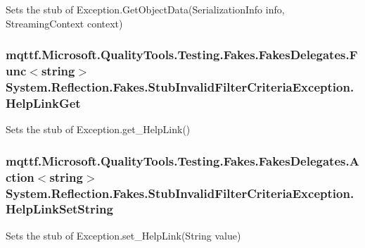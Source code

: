 Sets the stub of Exception.\-Get\-Object\-Data(\-Serialization\-Info info, Streaming\-Context context)

\hypertarget{class_system_1_1_reflection_1_1_fakes_1_1_stub_invalid_filter_criteria_exception_acaaad7e3ec7c490e4639ea72b419d6a7}{
\subsubsection[{Help\-Link\-Get}]{\setlength{\rightskip}{0pt plus 5cm}mqttf.\-Microsoft.\-Quality\-Tools.\-Testing.\-Fakes.\-Fakes\-Delegates.\-Func$<$string$>$ System.\-Reflection.\-Fakes.\-Stub\-Invalid\-Filter\-Criteria\-Exception.\-Help\-Link\-Get}}\label{class_system_1_1_reflection_1_1_fakes_1_1_stub_invalid_filter_criteria_exception_acaaad7e3ec7c490e4639ea72b419d6a7}


Sets the stub of Exception.\-get\-\_\-\-Help\-Link()

\hypertarget{class_system_1_1_reflection_1_1_fakes_1_1_stub_invalid_filter_criteria_exception_a18efd7ed48f4fd4dcf24823d49ee20ef}{
\subsubsection[{Help\-Link\-Set\-String}]{\setlength{\rightskip}{0pt plus 5cm}mqttf.\-Microsoft.\-Quality\-Tools.\-Testing.\-Fakes.\-Fakes\-Delegates.\-Action$<$string$>$ System.\-Reflection.\-Fakes.\-Stub\-Invalid\-Filter\-Criteria\-Exception.\-Help\-Link\-Set\-String}}\label{class_system_1_1_reflection_1_1_fakes_1_1_stub_invalid_filter_criteria_exception_a18efd7ed48f4fd4dcf24823d49ee20ef}


Sets the stub of Exception.\-set\-\_\-\-Help\-Link(\-String value)

